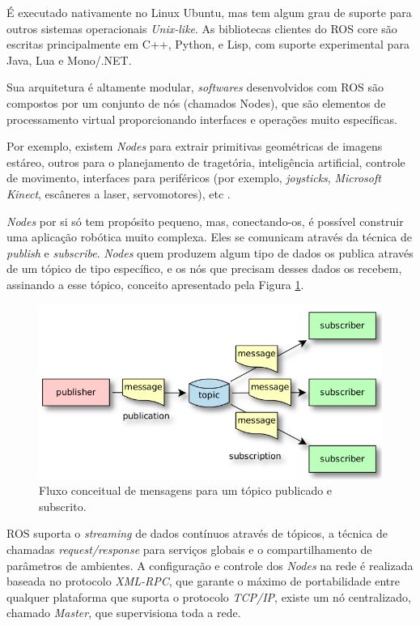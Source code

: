 \documentclass[conference]{IEEEtran}
\begin{document}
É executado nativamente no Linux Ubuntu, mas tem algum grau de suporte para outros sistemas operacionais \textit{Unix-like}. As bibliotecas clientes do ROS core são escritas principalmente em C++, Python, e Lisp, com suporte experimental para Java, Lua e Mono/.NET.

Sua arquitetura é altamente modular, \textit{softwares} desenvolvidos com ROS são compostos por um conjunto de nós (chamados Nodes), que são elementos de processamento virtual proporcionando interfaces e operações muito específicas.

Por exemplo, existem \textit{Nodes} para extrair primitivas geométricas de imagens estáreo, outros para o planejamento de tragetória, inteligência artificial, controle de movimento, interfaces para periféricos (por exemplo, \textit{joysticks}, \textit{Microsoft Kinect}, escâneres a laser, servomotores), etc \cite{ros_components}.

\textit{Nodes} por si só tem propósito pequeno, mas, conectando-os, é possível construir uma aplicação robótica muito complexa. Eles se comunicam através da técnica de \textit{publish} e \textit{subscribe}. \textit{Nodes} quem produzem algum tipo de dados os publica através de um tópico de tipo específico, e os nós que precisam desses dados os recebem, assinando a esse tópico, conceito apresentado pela Figura \ref{fig:ros_pubsub}.

\begin{figure}[h]
	\centering
	\includegraphics[scale=0.22]{files/ros_pubsub.png}
	\caption{Fluxo conceitual de mensagens para um tópico publicado e subscrito.  \cite{ros_components}}
	\label{fig:ros_pubsub}
\end{figure}

ROS suporta o \textit{streaming} de dados contínuos através de tópicos, a técnica de chamadas \textit{request/response} para serviços globais e o compartilhamento de parâmetros de ambientes. A configuração e controle dos \textit{Nodes} na rede é realizada baseada no protocolo \textit{XML-RPC}, que garante o máximo de portabilidade entre qualquer plataforma que suporta o protocolo \textit{TCP/IP}, existe um nó centralizado, chamado \textit{Master}, que supervisiona toda a rede.
\end{document}
